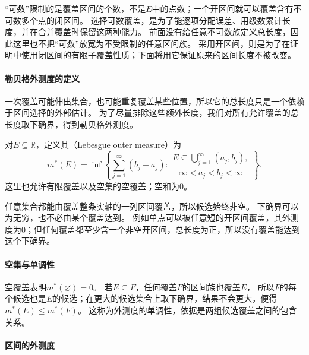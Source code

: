 “可数”限制的是覆盖区间的个数，不是$E$中的点数；一个开区间就可以覆盖含有不可数多个点的闭区间。
选择可数覆盖，是为了能逐项分配误差、用级数累计长度，并在合并覆盖时保留这两种能力。
前面没有给任意不可数族定义总长度，因此这里也不把“可数”放宽为不受限制的任意区间族。
采用开区间，则是为了在证明中使用闭区间的有限子覆盖性质；下面将用它保证原来的区间长度不被改变。

\paragraph{勒贝格外测度的定义}

一次覆盖可能伸出集合，也可能重复覆盖某些位置，所以它的总长度只是一个依赖于区间选择的外部估计。
为了尽量排除这些额外长度，我们对所有允许覆盖的总长度取下确界，得到勒贝格外测度。
\begin{definition}[勒贝格外测度]
\label{def:analysis-lebesgue-outer-measure}
对$E\subseteq\mathbb R$，定义其（Lebesgue outer measure）为
\begin{equation}
 m^*(E)=\inf\left\{\sum_{j=1}^{\infty}(b_j-a_j):
 \begin{array}{l}
 E\subseteq\bigcup_{j=1}^{\infty}(a_j,b_j),\\
 -\infty<a_j<b_j<\infty
 \end{array}\right\}.
 \label{eq:comb-lebesgue-outer-measure}
\end{equation}
这里也允许有限覆盖以及空集的空覆盖；空和为$0$。
\end{definition}

任意集合都能由覆盖整条实轴的一列区间覆盖，所以候选始终非空。
下确界可以为无穷，也不必由某个覆盖达到。
例如单点可以被任意短的开区间覆盖，其外测度为$0$；但任何覆盖都至少含一个非空开区间，总长度为正，所以没有覆盖能达到这个下确界。

\paragraph{空集与单调性}

空覆盖表明$m^*(\varnothing)=0$。
若$E\subseteq F$，任何覆盖$F$的区间族也覆盖$E$，
所以$F$的每个候选也是$E$的候选；在更大的候选集合上取下确界，结果不会更大，便得$m^*(E)\leq m^*(F)$。
这称为外测度的单调性，依据是两组候选覆盖之间的包含关系。

\paragraph{区间的外测度}

